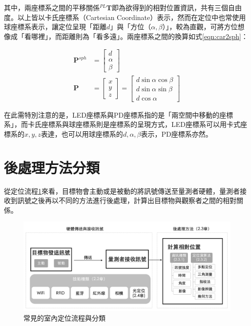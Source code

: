     
    
   其中，兩座標系之間的平移關係$^{PL}\boldsymbol{T}$即為欲得到的相對位置資訊，共有三個自由度。以上皆以卡氏座標系（Cartesian Coordinate）表示，然而在定位中也常使用球座標系表示，讓定位呈現「距離$d$」與「方位（$\alpha,\beta$）」，較為直觀，可將方位想像成「看哪裡」，而距離則為「看多遠」。兩座標系之間的換算如式\ref{eqn:car2sph}：

   \begin{equation}
    \label{eqn:car2sph}
        \begin{aligned}
        \boldsymbol{P}^{sph}&=\left[\begin{array}{c}
            d\\\alpha\\\beta
            \end{array}\right] \\  
        \boldsymbol{P} &= \left[\begin{array}{c}
            x\\y\\z
            \end{array}\right]=
            \left[\begin{array}{c}
            d\sin\alpha\cos\beta \\
            d\sin\alpha\sin\beta\\
            d\cos\alpha
            \end{array}\right] 
    \end{aligned}
   \end{equation}

   在此需特別注意的是，LED座標系與PD座標系指的是「兩空間中移動的座標系」，而卡氏座標系與球座標系則是座標系的呈現方式，LED座標系可以用卡式座標系的$x,y,z$表達，也可以用球座標系的$d,\alpha,\beta$表示，PD座標系亦然。



\section{後處理方法分類}
\label{chp:method}

    從定位流程\ref{pic:intro_pos}來看，目標物會主動或是被動的將訊號傳送至量測者硬體，量測者接收到訊號之後再以不同的方法進行後處理，計算出目標物與觀察者之間的相對關係。

    \begin{figure}[h]
        \centering
        \includegraphics[width=14cm]{ch1pic/intro_pos.png}
        \caption{常見的室內定位流程與分類}
        \label{pic:intro_pos}
    \end{figure}
    

